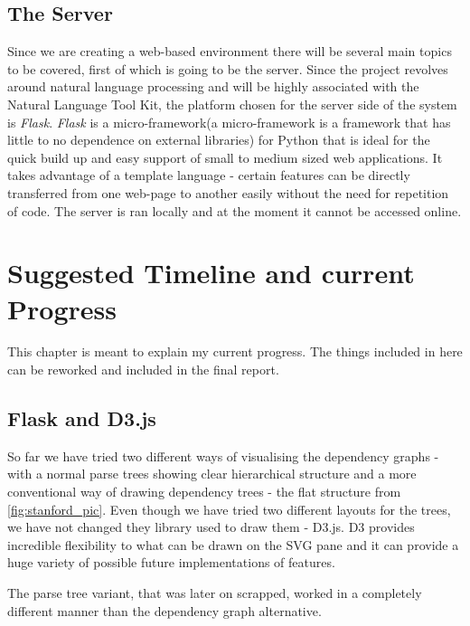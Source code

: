 \documentclass[bsc,frontabs,twoside,singlespacing,parskip,deptrepor]{infthesis}
\begin{document}
\section{The Server}
Since we are creating a web-based environment there will be several main topics to be covered, first of which is going to be the server. Since the project revolves around natural language processing and will be highly associated with the Natural Language Tool Kit, the platform chosen for the server side of the system is \textit{Flask}. \textit{Flask} is a micro-framework(a micro-framework is a framework that has little to no dependence on external libraries) for Python that is ideal for the quick build up and easy support of small to medium sized web applications. It takes advantage of a template language - certain features can be directly transferred from one web-page to another easily without the need for repetition of code. The server is ran locally and at the moment it cannot be accessed online.

\chapter{Suggested Timeline and current Progress}

This chapter is meant to explain my current progress. The things included in here can be reworked and included in the final report.

\section{Flask and D3.js}
So far we have tried two different ways of visualising the dependency graphs - with a normal parse trees showing clear hierarchical structure and a more conventional way of drawing dependency trees - the flat structure from \ref{fig:stanford_pic}. Even though we have tried two different layouts for the trees, we have not changed they library used to draw them - D3.js. D3 provides incredible flexibility to what can be drawn on the SVG pane and it can provide a huge variety of possible future implementations of features. 

The parse tree variant, that was later on scrapped, worked in a completely different manner than the dependency graph alternative.
\end{document}
